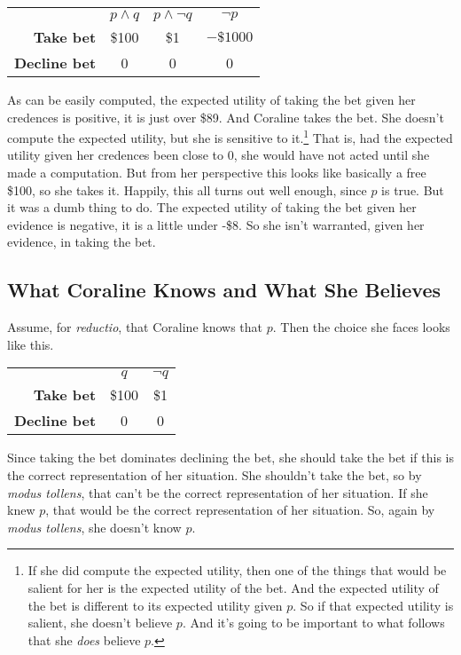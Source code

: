 \begin{center}
\begin{tabular}{r c c c}
 & \textbf{\(p \wedge q\)} & \textbf{\(p \wedge \neg q\)} & \textbf{\(\neg p\)} \\
\textbf{Take bet} & \$100 & \$1 & \(-\$1000\) \\
\textbf{Decline bet} & 0 & 0 & 0 \\
\end{tabular}
\end{center}

\noindent As can be easily computed, the expected utility of taking the bet given her credences is positive, it is just over \$89. And Coraline takes the bet. She doesn't compute the expected utility, but she is sensitive to it.\footnote{If she did compute the expected utility, then one of the things that would be salient for her is the expected utility of the bet. And the expected utility of the bet is different to its expected utility given \(p\). So if that expected utility is salient, she doesn't believe \(p\). And it's going to be important to what follows that she \textit{does} believe \(p\).} That is, had the expected utility given her credences been close to 0, she would have not acted until she made a computation. But from her perspective this looks like basically a free \$100, so she takes it. Happily, this all turns out well enough, since \(p\) is true. But it was a dumb thing to do. The expected utility of taking the bet given her evidence is negative, it is a little under -\$8. So she isn't warranted, given her evidence, in taking the bet.

\subsection{What Coraline Knows and What She Believes}

Assume, for \textit{reductio}, that Coraline knows that $p$. Then the choice she faces looks like this.

\begin{center}
\begin{tabular}{r c c}
 & \textbf{\(q\)} & \textbf{\(\neg q\)}  \\
\textbf{Take bet} & \$100 & \$1 \\
\textbf{Decline bet} & 0 & 0\\
\end{tabular}
\end{center}

\noindent Since taking the bet dominates declining the bet, she should take the bet if this is the correct representation of her situation. She shouldn't take the bet, so by \textit{modus tollens}, that can't be the correct representation of her situation. If she knew $p$, that would be the correct representation of her situation. So, again by \textit{modus tollens}, she doesn't know $p$.

